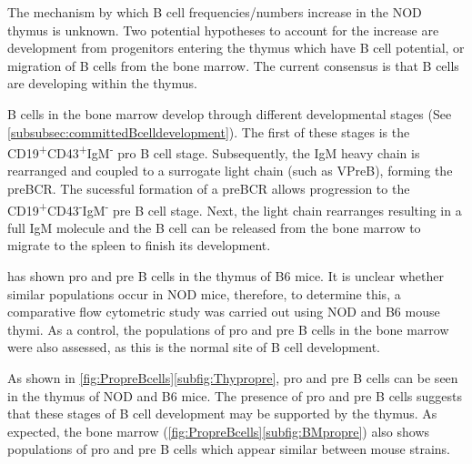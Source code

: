 The mechanism by which B cell frequencies/numbers increase in the NOD thymus is unknown. 
Two potential hypotheses to account for the increase are development from progenitors entering the thymus which have B cell potential, or migration of B cells from the bone marrow. \toref{}
The current consensus is that B cells are developing within the thymus. 

B cells in the bone marrow develop through different developmental stages (See \cref{subsubsec:committedBcelldevelopment}).
The first of these stages is the CD19\textsuperscript{+}CD43\textsuperscript{+}IgM\textsuperscript{-} pro B cell stage.
Subsequently, the IgM heavy chain is rearranged and coupled to a surrogate light chain (such as VPreB), forming the preBCR. 
The sucessful formation of a preBCR allows progression to the CD19\textsuperscript{+}CD43\textsuperscript{-}IgM\textsuperscript{-} pre B cell stage.
Next, the light chain rearranges resulting in a full IgM molecule and the B cell can be released from the bone marrow to migrate to the spleen to finish its development.


\citet{Akashi2000} has shown pro and pre B cells in the thymus of B6 mice.
It is unclear whether similar populations occur in NOD mice, therefore, to determine this, a comparative flow cytometric study was carried out using NOD and B6 mouse thymi.
As a control, the populations of pro and pre B cells in the bone marrow were also assessed, as this is the normal site of B cell development.

As shown in \cref{fig:PropreBcells}\ref{subfig:Thypropre}, pro and pre B cells can be seen in the thymus of NOD and B6 mice.
The presence of pro and pre B cells suggests that these stages of B cell development may be supported by the thymus. 
As expected, the bone marrow (\cref{fig:PropreBcells}\ref{subfig:BMpropre}) also shows populations of pro and pre B cells which appear similar between mouse strains.


